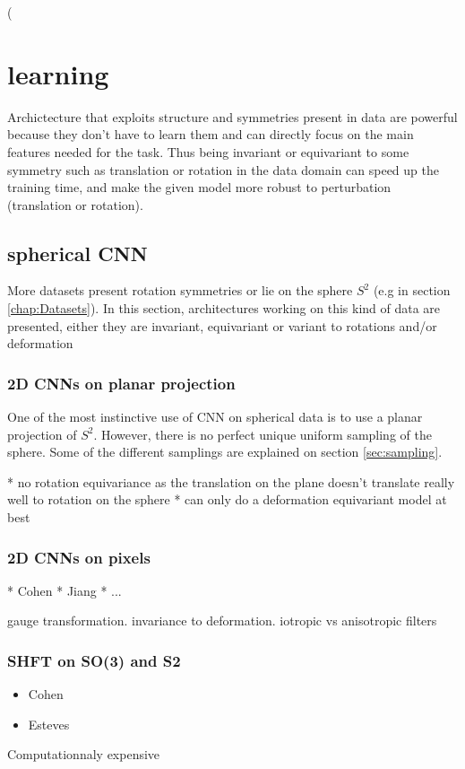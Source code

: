 \documentclass[11pt]{report}
\begin{document}
(

\section{learning}
Archictecture that exploits structure and symmetries present in data are powerful because they don't have to learn them and can directly focus on the main features needed for the task. Thus being invariant or equivariant to some symmetry such as translation or rotation in the data domain can speed up the training time, and make the given model more robust to perturbation (translation or rotation).
\subsection{spherical CNN}
More datasets present rotation symmetries or lie on the sphere $S^2$ (e.g in section \ref{chap:Datasets}). In this section, architectures working on this kind of data are presented, either they are invariant, equivariant or variant to rotations and/or deformation
\subsubsection{2D CNNs on planar projection}
One of the most instinctive use of CNN on spherical data is to use a planar projection of $S^2$. However, there is no perfect unique uniform sampling of the sphere. Some of the different samplings are explained on section \ref{sec:sampling}.


* no rotation equivariance as the translation on the plane doesn't translate really well to rotation on the sphere
* can only do a deformation equivariant model at best
\cite{boomsma_spherical_2017}
\subsubsection{2D CNNs on pixels}
* Cohen \cite{cohen_gauge_2019}
* Jiang \cite{jiang_spherical_2019}
* ...

gauge transformation. invariance to deformation. iotropic vs anisotropic filters
\subsubsection{SHFT on SO(3) and S2}
\begin{itemize}
    \item Cohen \cite{cohen_spherical_2018}
    \item Esteves \cite{esteves_learning_2017}
\end{itemize}
Computationnaly expensive
\end{document}
